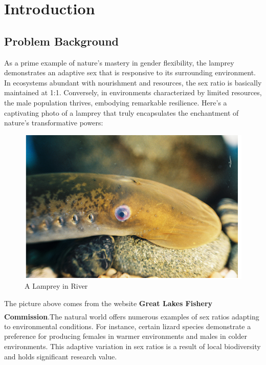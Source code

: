\documentclass[12pt]{article}  %
\newcommand{\upcite}[1]{\textsuperscript{\textsuperscript{\cite{#1}}}}
\begin{document}
\tableofcontents  %


\section{Introduction}

\subsection{Problem Background}
As a prime example of nature's mastery in gender flexibility, the lamprey demonstrates an adaptive sex that is responsive to its surrounding environment.   In ecosystems abundant with nourishment and resources, the sex ratio is basically maintained at 1:1.   Conversely, in environments characterized by limited resources, the male population thrives, embodying remarkable resilience.   Here's a captivating photo of a lamprey that truly encapsulates the enchantment of nature's transformative powers:
\begin{figure}[htbp]  %
\centering  %
\includegraphics[width=.7\textwidth]{lamprey.png} %
\caption{A Lamprey in River}
\label{fig:lamprey} %
\end{figure}

The picture above comes from the website \textbf{Great Lakes Fishery Commission}\upcite{1}.The natural world offers numerous examples of sex ratios adapting to environmental conditions.  For instance, certain lizard species demonstrate a preference for producing females in warmer environments and males in colder environments.  This adaptive variation in sex ratios is a result of local biodiversity and holds significant research value.
\end{document}
